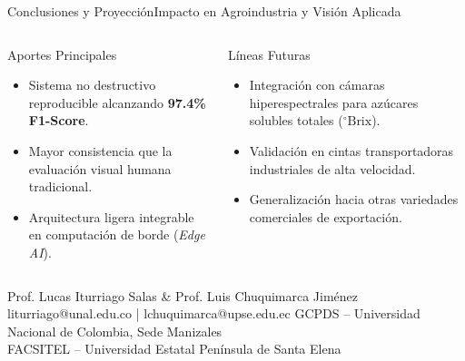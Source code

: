 \documentclass[aspectratio=169, 10pt]{beamer}
\begin{document}
\begin{frame}{Conclusiones y Proyección}{Impacto en Agroindustria y Visión Aplicada}
    \begin{columns}[T]
        \begin{block}{Aportes Principales}
            \begin{itemize}
                \item Sistema no destructivo reproducible alcanzando \textbf{97.4\% F1-Score}.
                \item Mayor consistencia que la evaluación visual humana tradicional.
                \item Arquitectura ligera integrable en computación de borde (\textit{Edge AI}).
            \end{itemize}
        \end{block}

        \begin{successblock}{Líneas Futuras}
            \begin{itemize}
                \item Integración con cámaras hiperespectrales para azúcares solubles totales ($^\circ\text{Brix}$).
                \item Validación en cintas transportadoras industriales de alta velocidad.
                \item Generalización hacia otras variedades comerciales de exportación.
            \end{itemize}
        \end{successblock}
    \end{columns}
\end{frame}

\makeETCMclosingpage
{Prof. Lucas Iturriago Salas \& Prof. Luis Chuquimarca Jiménez}
{liturriago@unal.edu.co \quad | \quad lchuquimarca@upse.edu.ec}
{GCPDS -- Universidad Nacional de Colombia, Sede Manizales \\ FACSITEL -- Universidad Estatal Península de Santa Elena}
\end{document}
